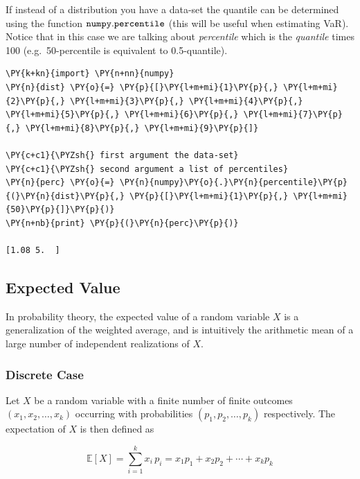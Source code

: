 If instead of a distribution you have a data-set the quantile can be
determined using the function \(\tt{numpy.percentile}\) (this will be
useful when estimating VaR). Notice that in this case we are talking
about \emph{percentile} which is the \emph{quantile} times 100
(e.g.~50-percentile is equivalent to 0.5-quantile).

\begin{tcolorbox}[breakable, size=fbox, boxrule=1pt, pad at break*=1mm,colback=cellbackground, colframe=cellborder]
\begin{Verbatim}[commandchars=\\\{\}]
\PY{k+kn}{import} \PY{n+nn}{numpy}
\PY{n}{dist} \PY{o}{=} \PY{p}{[}\PY{l+m+mi}{1}\PY{p}{,} \PY{l+m+mi}{2}\PY{p}{,} \PY{l+m+mi}{3}\PY{p}{,} \PY{l+m+mi}{4}\PY{p}{,} \PY{l+m+mi}{5}\PY{p}{,} \PY{l+m+mi}{6}\PY{p}{,} \PY{l+m+mi}{7}\PY{p}{,} \PY{l+m+mi}{8}\PY{p}{,} \PY{l+m+mi}{9}\PY{p}{]}
		
\PY{c+c1}{\PYZsh{} first argument the data-set}
\PY{c+c1}{\PYZsh{} second argument a list of percentiles}
\PY{n}{perc} \PY{o}{=} \PY{n}{numpy}\PY{o}{.}\PY{n}{percentile}\PY{p}{(}\PY{n}{dist}\PY{p}{,} \PY{p}{[}\PY{l+m+mi}{1}\PY{p}{,} \PY{l+m+mi}{50}\PY{p}{]}\PY{p}{)}		
\PY{n+nb}{print} \PY{p}{(}\PY{n}{perc}\PY{p}{)}
		
[1.08 5.  ]
\end{Verbatim}
\end{tcolorbox}

\subsection{Expected Value}\label{sec:expected-value}

In probability theory, the expected value of a random variable \(X\) is
a generalization of the weighted average, and is intuitively the
arithmetic mean of a large number of independent realizations of \(X\).

\subsubsection{Discrete Case}
Let \(X\) be a random variable with a finite number of finite outcomes
\((x_{1},x_{2},\ldots ,x_{k})\) occurring with probabilities
\((p_{1},p_{2},\ldots ,p_{k})\) respectively. The expectation of \(X\)
is then defined as

\begin{equation}
	\mathbb{E}[X]=\sum _{i=1}^{k}x_{i}\,p_{i}=x_{1}p_{1}+x_{2}p_{2}+\cdots +x_{k}p_{k}
\end{equation}

